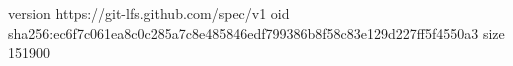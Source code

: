 version https://git-lfs.github.com/spec/v1
oid sha256:ec6f7c061ea8c0c285a7c8e485846edf799386b8f58c83e129d227ff5f4550a3
size 151900
